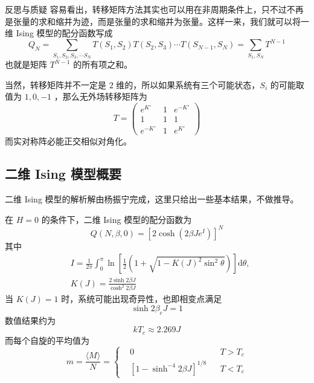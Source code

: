 \begin{justification}{\kaishu 反思与质疑}
\kaishu \fontsize{11pt}{16pt}
\quad\quad 容易看出，转移矩阵方法其实也可以用在非周期条件上，只不过不再是张量的求和缩并为迹，而是张量的求和缩并为张量。这样一来，我们就可以将一维 Ising 模型的配分函数写成
\begin{equation}
    Q_N = \sum_{S_1,S_2,S_3,\cdots S_N} T(S_1,S_2) T(S_2,S_3) \cdots T(S_{N-1},S_{N}) = \sum_{S_1, S_N} T^{N-1}
\end{equation}
也就是矩阵 $T^{N-1}$ 的所有项之和。

\quad\quad 当然，转移矩阵并不一定是 $2$ 维的，所以如果系统有三个可能状态，$S_i$ 的可能取值为 $1,0,-1$ ，那么无外场转移矩阵为
\begin{equation}
    T = \begin{pmatrix}
        e^{K'} & 1 & e^{-K'} \\
        1 & 1 & 1 \\
        e^{-K'} & 1 & e^{K'}
    \end{pmatrix}
\end{equation}
而实对称阵必能正交相似对角化。
\end{justification}

\subsection{二维 Ising 模型概要}\label{sub:二维 Ising 模型概要}

二维 Ising 模型的解析解由杨振宁完成，这里只给出一些基本结果，不做推导。

在 $H = 0$ 的条件下，二维 Ising 模型的配分函数为
\begin{equation}
    Q(N,\beta,0) = \left[2\cosh (2\beta J e^I)\right]^N
\end{equation}
其中
\begin{align*}
    &I = \frac{1}{2\pi} \int_0^\pi \ln \left[\frac{1}{2} \left(1 + \sqrt{1 -K(J)^2\sin^2 \theta}\right)\right] \mathrm{d}\theta, \\
    &K(J) = \frac{2\sinh 2\beta J}{\cosh^2 2\beta J}
\end{align*}
当 $K(J) = 1$ 时，系统可能出现奇异性，也即相变点满足
\begin{equation}
    \sinh 2\beta_c J = 1
\end{equation}
数值结果约为
\begin{equation}
    kT_c \approx 2.269J
\end{equation}
而每个自旋的平均值为
\begin{equation}
    m = \frac{\langle M \rangle}{N} = \left\{\begin{aligned}
        &0 && T > T_c \\
        &\left[1 - \sinh^{-4} 2\beta J\right]^{1/8} && T < T_c
    \end{aligned}\right.
\end{equation}

